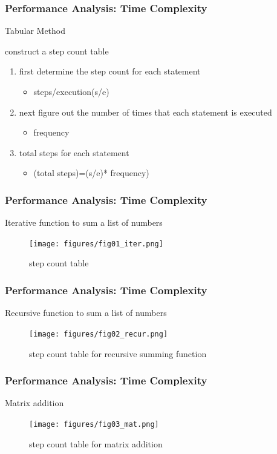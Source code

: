 \documentclass[newPxFont,sthlmFooter,nooffset]{beamer}
\begin{document}
\begin{frame}[t]
  \frametitle{Performance Analysis: Time Complexity}
Tabular Method

construct a step count table
\begin{enumerate}
\item first determine the step count for each statement
  \begin{itemize}
  \item steps/execution(s/e)
  \end{itemize}

\item next figure out the number of times that
  each statement is executed
  \begin{itemize}
  \item frequency
  \end{itemize}

\item total steps for each
  statement
  \begin{itemize}
  \item (total steps)=(s/e)* frequency)
  \end{itemize}

\end{enumerate}

\end{frame}


\begin{frame}[t]
  \frametitle{Performance Analysis: Time Complexity}
Iterative function to sum a list of numbers
  \begin{figure}[h]
    \centering
    \texttt{[image: figures/fig01\_iter.png]}
    \caption{step count table}
  \end{figure}
\end{frame}

\begin{frame}[t]
  \frametitle{Performance Analysis: Time Complexity}
Recursive function to sum a list of numbers
  \begin{figure}[h]
    \centering
    \texttt{[image: figures/fig02\_recur.png]}
    \caption{step count table for recursive summing function}
  \end{figure}
\end{frame}

\begin{frame}[t]
  \frametitle{Performance Analysis: Time Complexity}
Matrix addition
  \begin{figure}[h]
    \centering
    \texttt{[image: figures/fig03\_mat.png]}
    \caption{step count table for matrix addition}
  \end{figure}
\end{frame}
\end{document}
